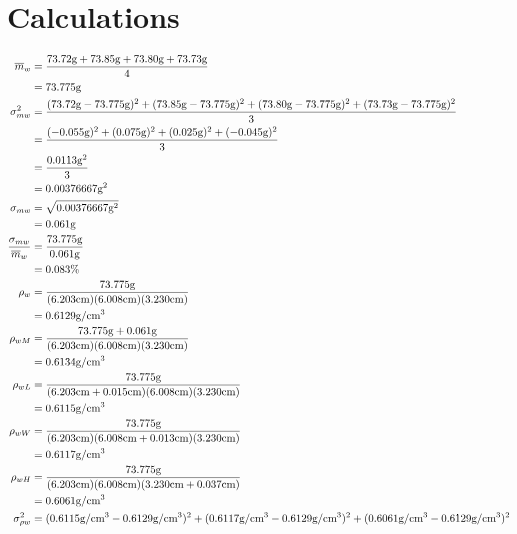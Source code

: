 \documentclass[12pt]{article}
\begin{document}
\begin{center}
        \end{center}

    \section{Calculations}
    \begin{align*}
        \overline{m}_w &= \frac{73.72\text{g}+73.85\text{g}+73.80\text{g}+73.73\text{g}}{4}\\
        &=73.775\text{g}\\
        \sigma_{mw}^2 &= \frac{(73.72\text{g}-73.775\text{g})^2+(73.85\text{g}-73.775\text{g})^2+(73.80\text{g}-73.775\text{g})^2+(73.73\text{g}-73.775\text{g})^2}{3}\\
        &=\frac{(-0.055\text{g})^2+(0.075\text{g})^2+(0.025\text{g})^2+(-0.045\text{g})^2}{3}\\
        &=\frac{0.0113\text{g}^2}{3}\\
        &=0.00376667\text{g}^2\\
        \sigma_{mw} &= \sqrt{0.00376667\text{g}^2}\\
        &=0.061\text{\text{g}}\\
        \frac{\sigma_{mw}}{\overline{m}_w} & = \frac{73.775\text{\text{g}}}{0.061\text{\text{g}}}\\
        &=0.083\%\\
        \rho_w &= \frac{73.775 \text{g}}{(6.203\text{cm})(6.008\text{cm})(3.230\text{cm})}\\
        &= 0.6129 \text{g}/\text{\text{cm}}^3\\
        \rho_{wM} &= \frac{73.775 \text{g}+0.061\text{g}}{(6.203\text{cm})(6.008\text{cm})(3.230\text{cm})}\\
        &= 0.6134\text{g}/\text{\text{cm}}^3\\
        \rho_{wL} &= \frac{73.775 \text{g}}{(6.203\text{cm}+0.015\text{cm})(6.008\text{cm})(3.230\text{cm})}\\
        &= 0.6115\text{g}/\text{\text{cm}}^3\\
        \rho_{wW} &= \frac{73.775\text{g}}{(6.203\text{cm})(6.008\text{cm}+0.013\text{cm})(3.230\text{cm})}\\
        &= 0.6117\text{g}/\text{\text{cm}}^3\\
        \rho_{wH} &= \frac{73.775\text{g}}{(6.203\text{cm})(6.008\text{cm})(3.230\text{cm}+0.037\text{cm})}\\
        &= 0.6061\text{g}/\text{\text{cm}}^3\\
        \sigma_{\rho w}^2 &= (0.6115\text{g}/\text{\text{cm}}^3-0.6129\text{g}/\text{\text{cm}}^3)^2 + (0.6117\text{g}/\text{\text{cm}}^3-0.6129\text{g}/\text{\text{cm}}^3)^2 + (0.6061\text{g}/\text{\text{cm}}^3-0.6129\text{g}/\text{\text{cm}}^3)^2\\

\end{align*}
\end{document}
